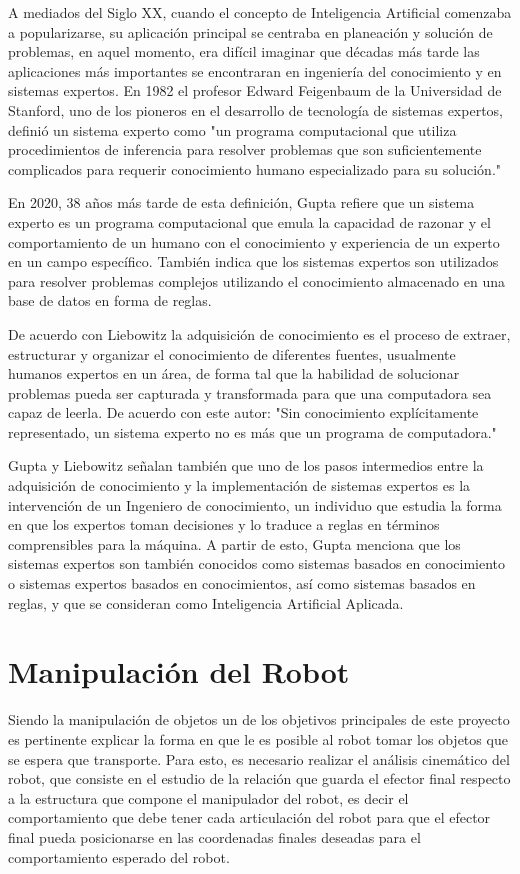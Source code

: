 A mediados del Siglo XX, cuando el concepto de Inteligencia Artificial comenzaba a popularizarse, su aplicación principal se centraba en planeación y solución de problemas, en aquel momento, era difícil imaginar que décadas más tarde las aplicaciones más importantes se encontraran en ingeniería del conocimiento y en sistemas expertos. En 1982 el profesor Edward Feigenbaum de la Universidad de Stanford, uno de los pioneros en el desarrollo de tecnología de sistemas expertos, definió un sistema experto como "un programa computacional que utiliza procedimientos de inferencia para resolver problemas que son suficientemente complicados para requerir conocimiento humano especializado para su solución."
\cite{giarratano_zhuan_2002}

En 2020, 38 años más tarde de esta definición, Gupta \cite{gupta_artificial_2020} refiere que un sistema experto es un programa computacional que emula la capacidad de razonar y el comportamiento de un humano con el conocimiento y experiencia de un experto en un campo específico. También indica que los sistemas expertos son utilizados para resolver problemas complejos utilizando el conocimiento almacenado en una base de datos en forma de reglas. 

De acuerdo con Liebowitz \cite{liebowitz_handbook_2019} la adquisición de conocimiento es el proceso de extraer, estructurar y organizar el conocimiento de diferentes fuentes, usualmente humanos expertos en un área, de forma tal que la habilidad de solucionar problemas pueda ser capturada y transformada para que una computadora sea capaz de leerla. De acuerdo con este autor: "Sin conocimiento explícitamente representado, un sistema experto no es más que un programa de computadora."

Gupta y Liebowitz señalan también que uno de los pasos intermedios entre la adquisición de conocimiento y la implementación de sistemas expertos es la intervención de un Ingeniero de conocimiento, un individuo que estudia la forma en que los expertos toman decisiones y lo traduce a reglas en términos comprensibles para la máquina. A partir de esto, Gupta menciona que los sistemas expertos son también conocidos como sistemas basados en conocimiento o sistemas expertos basados en conocimientos, así como sistemas basados en reglas, y que se consideran como Inteligencia Artificial Aplicada. 

\section{Manipulación del Robot}
Siendo la manipulación de objetos un de los objetivos principales de este proyecto es pertinente explicar la forma en que le es posible al robot tomar los objetos que se espera que transporte. Para esto, es necesario realizar el análisis cinemático del robot, que consiste en el estudio de la relación que guarda el efector final respecto a la estructura que compone el manipulador del robot, es decir el comportamiento que debe tener cada articulación del robot para que el efector final pueda posicionarse en las coordenadas finales deseadas para el comportamiento esperado del robot.

